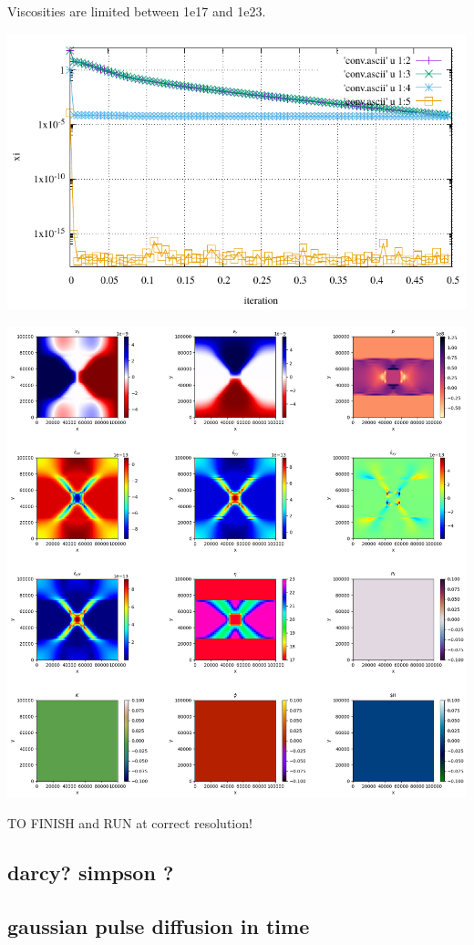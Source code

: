 \documentclass[a4paper]{article}
\begin{document}
Viscosities are limited between 1e17 and 1e23.

\includegraphics[width=14cm]{./results/benchmark_viscoplastic_block/conv.pdf}

\newpage
\begin{center}
\includegraphics[width=14cm]{./results/benchmark_viscoplastic_block/img_solution_0000.png}
\end{center}

TO FINISH and RUN at correct resolution!



\subsection{darcy? simpson ?}


\subsection{gaussian pulse diffusion in time}






\newpage
\printbibliography
\end{document}
